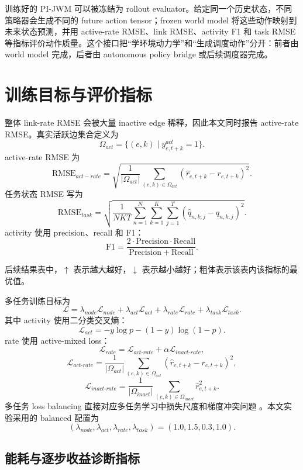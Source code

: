 \documentclass[letterpaper,journal]{IEEEtran}
\newcommand{\pjwm}{PI-JWM}
\begin{document}
训练好的 \pjwm{} 可以被冻结为 rollout evaluator。给定同一个历史状态，不同策略器会生成不同的 future action tensor；frozen world model 将这些动作映射到未来状态预测，并用 active-rate RMSE、link RMSE、activity F1 和 task RMSE 等指标评价动作质量。这个接口把“学环境动力学”和“生成调度动作”分开：前者由 world model 完成，后者由 autonomous policy bridge 或后续调度器完成。

\section{训练目标与评价指标}

整体 link-rate RMSE 会被大量 inactive edge 稀释，因此本文同时报告 active-rate RMSE。真实活跃边集合定义为
\[
\Omega_{act}=\{(e,k)\mid y_{e,t+k}^{act}=1\}.
\]
active-rate RMSE 为
\[
\mathrm{RMSE}_{act-rate}
=\sqrt{\frac{1}{|\Omega_{act}|}\sum_{(e,k)\in\Omega_{act}}
(\hat r_{e,t+k}-r_{e,t+k})^2}.
\]
任务状态 RMSE 写为
\[
\mathrm{RMSE}_{task}
=\sqrt{\frac{1}{NKT}\sum_{n=1}^{N}\sum_{k=1}^{K}\sum_{j=1}^{T}
(\hat q_{n,k,j}-q_{n,k,j})^2}.
\]
activity 使用 precision、recall 和 F1：
\[
\mathrm{F1}=\frac{2\cdot \mathrm{Precision}\cdot \mathrm{Recall}}{\mathrm{Precision}+\mathrm{Recall}}.
\]

后续结果表中，$\uparrow$ 表示越大越好，$\downarrow$ 表示越小越好；粗体表示该表内该指标的最优值。

多任务训练目标为
\[
\mathcal{L}=\lambda_{node}\mathcal{L}_{node}
+\lambda_{act}\mathcal{L}_{act}
+\lambda_{rate}\mathcal{L}_{rate}
+\lambda_{task}\mathcal{L}_{task}.
\]
其中 activity 使用二分类交叉熵：
\[
\mathcal{L}_{act}=-y\log p-(1-y)\log(1-p).
\]
rate 使用 active-mixed loss：
\[
\mathcal{L}_{rate}=\mathcal{L}_{act\text{-}rate}
+\alpha\mathcal{L}_{inact\text{-}rate},
\]
\[
\mathcal{L}_{act\text{-}rate}
=\frac{1}{|\Omega_{act}|}\sum_{(e,k)\in\Omega_{act}}
(\hat r_{e,t+k}-r_{e,t+k})^2,
\]
\[
\mathcal{L}_{inact\text{-}rate}
=\frac{1}{|\Omega_{inact}|}\sum_{(e,k)\in\Omega_{inact}}
\hat r_{e,t+k}^{2}.
\]
多任务 loss balancing 直接对应多任务学习中损失尺度和梯度冲突问题 \cite{zhang2022mtl}\cite{kendall2018uncertainty}\cite{chen2018gradnorm}。本文实验采用的 balanced 配置为
\[
(\lambda_{node},\lambda_{act},\lambda_{rate},\lambda_{task})=(1.0,1.5,0.3,1.0).
\]

\subsection{能耗与逐步收益诊断指标}
\end{document}
